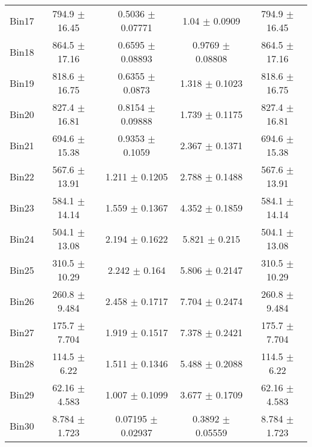 \begin{tabular}{@{\extracolsep{4pt}}lcccc@{}}
     Bin17 & 794.9 $\pm$ 16.45 & 0.5036 $\pm$ 0.07771 & 1.04 $\pm$ 0.0909 & 794.9 $\pm$ 16.45 \\ 
     Bin18 & 864.5 $\pm$ 17.16 & 0.6595 $\pm$ 0.08893 & 0.9769 $\pm$ 0.08808 & 864.5 $\pm$ 17.16 \\ 
     Bin19 & 818.6 $\pm$ 16.75 & 0.6355 $\pm$ 0.0873 & 1.318 $\pm$ 0.1023 & 818.6 $\pm$ 16.75 \\ 
     Bin20 & 827.4 $\pm$ 16.81 & 0.8154 $\pm$ 0.09888 & 1.739 $\pm$ 0.1175 & 827.4 $\pm$ 16.81 \\ 
     Bin21 & 694.6 $\pm$ 15.38 & 0.9353 $\pm$ 0.1059 & 2.367 $\pm$ 0.1371 & 694.6 $\pm$ 15.38 \\ 
     Bin22 & 567.6 $\pm$ 13.91 & 1.211 $\pm$ 0.1205 & 2.788 $\pm$ 0.1488 & 567.6 $\pm$ 13.91 \\ 
     Bin23 & 584.1 $\pm$ 14.14 & 1.559 $\pm$ 0.1367 & 4.352 $\pm$ 0.1859 & 584.1 $\pm$ 14.14 \\ 
     Bin24 & 504.1 $\pm$ 13.08 & 2.194 $\pm$ 0.1622 & 5.821 $\pm$ 0.215 & 504.1 $\pm$ 13.08 \\ 
     Bin25 & 310.5 $\pm$ 10.29 & 2.242 $\pm$ 0.164 & 5.806 $\pm$ 0.2147 & 310.5 $\pm$ 10.29 \\ 
     Bin26 & 260.8 $\pm$ 9.484 & 2.458 $\pm$ 0.1717 & 7.704 $\pm$ 0.2474 & 260.8 $\pm$ 9.484 \\ 
     Bin27 & 175.7 $\pm$ 7.704 & 1.919 $\pm$ 0.1517 & 7.378 $\pm$ 0.2421 & 175.7 $\pm$ 7.704 \\ 
     Bin28 & 114.5 $\pm$ 6.22 & 1.511 $\pm$ 0.1346 & 5.488 $\pm$ 0.2088 & 114.5 $\pm$ 6.22 \\ 
     Bin29 & 62.16 $\pm$ 4.583 & 1.007 $\pm$ 0.1099 & 3.677 $\pm$ 0.1709 & 62.16 $\pm$ 4.583 \\ 
     Bin30 & 8.784 $\pm$ 1.723 & 0.07195 $\pm$ 0.02937 & 0.3892 $\pm$ 0.05559 & 8.784 $\pm$ 1.723 \\ 
\hline\hline
  \end{tabular}
